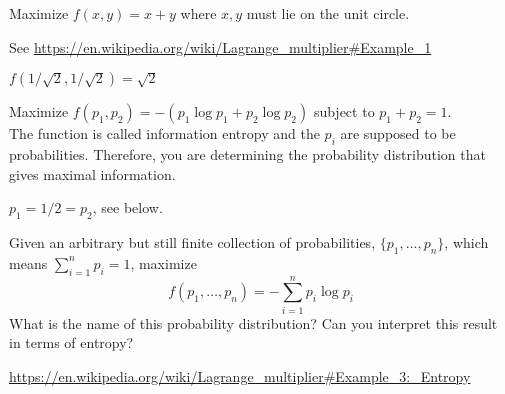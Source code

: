 \documentclass[addpoints]{exam}
\begin{document}
\printanswers
\begin{questions}
\question[30] Maximize $f(x,y) = x + y$ where $x,y$ must lie on the unit circle. 
\begin{solution}
See \url{https://en.wikipedia.org/wiki/Lagrange_multiplier#Example_1}

$f(1/\sqrt{2}, 1/\sqrt{2}) = \sqrt{2}$
\end{solution}

\question[30] Maximize $f(p_1,p_2) = -(p_1 \log p_1 + p_2  \log p_2)$ subject to $p_1 + p_2 = 1$.  \\
The function is called information entropy and the $p_i$ are supposed to be probabilities. Therefore, you are determining the probability distribution that gives maximal information. 

\begin{solution}
$p_1 = 1/2 = p_2$, see below. 
\end{solution}

\bonusquestion[5] Given an arbitrary but still finite collection of probabilities, $\{p_1, \dots, p_n \}$, which means  $\sum_{i = 1}^n p_i = 1$, maximize 
\[
f(p_1, \dots, p_n ) = -\sum_{i = 1}^n p_i \log p_i
\]
What is the name of this probability distribution? Can you interpret this result in terms of entropy?

\begin{solution}
\url{https://en.wikipedia.org/wiki/Lagrange_multiplier#Example_3:_Entropy}
\end{solution}
\end{questions}
\end{document}
